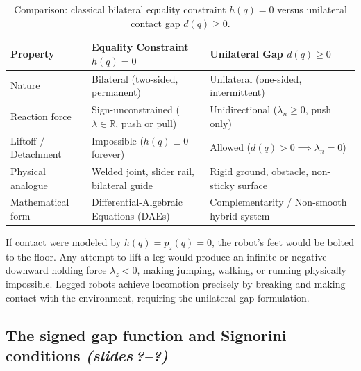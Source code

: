 \documentclass[11pt,a4paper]{article}
\newcommand{\R}{\mathbb{R}}
\newcommand{\sr}{\emph{(slides\,?--?)}}
\begin{document}
\begin{table}[ht]
\centering
\small
\renewcommand{\arraystretch}{1.25}
\begin{tabular}{@{}p{3.5cm}p{5.5cm}p{5.5cm}@{}}
\toprule
\textbf{Property} & \textbf{Equality Constraint $h(q)=0$} & \textbf{Unilateral Gap $d(q)\ge 0$} \\
\midrule
Nature & Bilateral (two-sided, permanent) & Unilateral (one-sided, intermittent) \\
Reaction force & Sign-unconstrained ($\lambda \in \R$, push or pull) & Unidirectional ($\lambda_n \ge 0$, push only) \\
Liftoff / Detachment & Impossible ($h(q)\equiv 0$ forever) & Allowed ($d(q) > 0 \implies \lambda_n = 0$) \\
Physical analogue & Welded joint, slider rail, bilateral guide & Rigid ground, obstacle, non-sticky surface \\
Mathematical form & Differential-Algebraic Equations (DAEs) & Complementarity / Non-smooth hybrid system \\
\bottomrule
\end{tabular}
\caption{Comparison: classical bilateral equality constraint $h(q)=0$ versus unilateral contact gap $d(q)\ge 0$.}
\label{tab:gap_vs_h}
\end{table}

\begin{intuition}
If contact were modeled by $h(q)=p_z(q)=0$, the robot's feet would be bolted to the floor. Any attempt to lift a leg would produce an infinite or negative downward holding force $\lambda_z < 0$, making jumping, walking, or running physically impossible. Legged robots achieve locomotion precisely by breaking and making contact with the environment, requiring the unilateral gap formulation.
\end{intuition}

\subsection{The signed gap function and Signorini conditions \sr}
\end{document}

